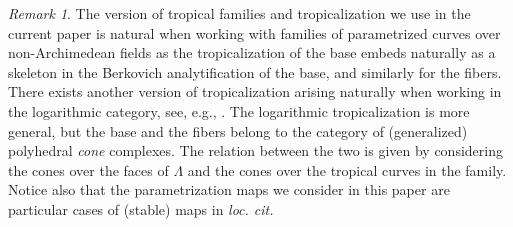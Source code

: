 \documentclass[11pt,reqno]{amsart}
\numberwithin{equation}{section}
\theoremstyle{definition}
\theoremstyle{remark}
\newtheorem{rem}[thm]{Remark}
\begin{document}
\begin{rem}\label{rem:tropfamother}
    The version of tropical families and tropicalization we use in the current paper is natural when working with families of parametrized curves over non-Archimedean fields as the tropicalization of the base embeds naturally as a skeleton in the Berkovich analytification of the base, and similarly for the fibers. There exists another version of tropicalization arising naturally when working in the logarithmic category, see, e.g., \cite{ACGS, CCUW, R17, Ran22}. The logarithmic tropicalization is more general, but the base and the fibers belong to the category of (generalized) polyhedral \emph{cone} complexes. The relation between the two is given by considering the cones over the faces of $\Lambda$ and the cones over the tropical curves in the family. Notice also that the parametrization maps we consider in this paper are particular cases of (stable) maps in {\em loc. cit.}
\end{rem}
\end{document}
